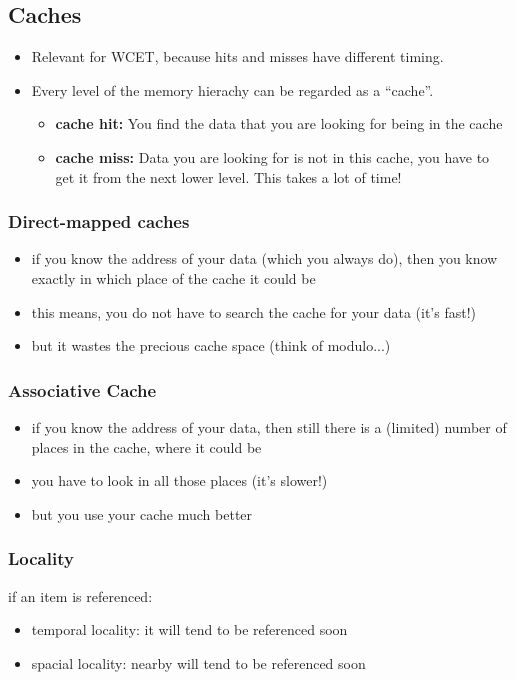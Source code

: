 \documentclass[fs, footer]{latex4ei}
\begin{document}
\begin{multicols*}{4}
{\subsection{Caches}
\begin{itemize}
\item Relevant for WCET, because hits and misses have different timing.
\item Every level of the memory hierachy can be regarded as a "`cache"'.
\begin{itemize}
\item \textbf{cache hit:} You find the data that you are looking for being in the cache
\item \textbf{cache miss:} Data you are looking for is not in this cache, you have to get it from the next lower level. This takes a lot of time!
\end{itemize}
\end{itemize}

\subsubsection{Direct-mapped caches}
\begin{itemize}
\item if you know the address of your data (which you always do), then you know exactly in which place of the cache it could be
\item this means, you do not have to search the cache for your data (it's fast!)
\item but it wastes the precious cache space (think of modulo...)
\end{itemize}

\subsubsection{Associative Cache}
\begin{itemize}
\item if you know the address of your data, then still there is a (limited) number of places in the cache, where it could be
\item you have to look in all those places (it's slower!)
\item but you use your cache much better
\end{itemize}

\subsubsection{Locality}
if an item is referenced:
\begin{itemize}
\item temporal locality: it will tend to be referenced soon
\item spacial locality: nearby will tend to be referenced soon
\end{itemize}

}
\end{multicols*}
\end{document}
